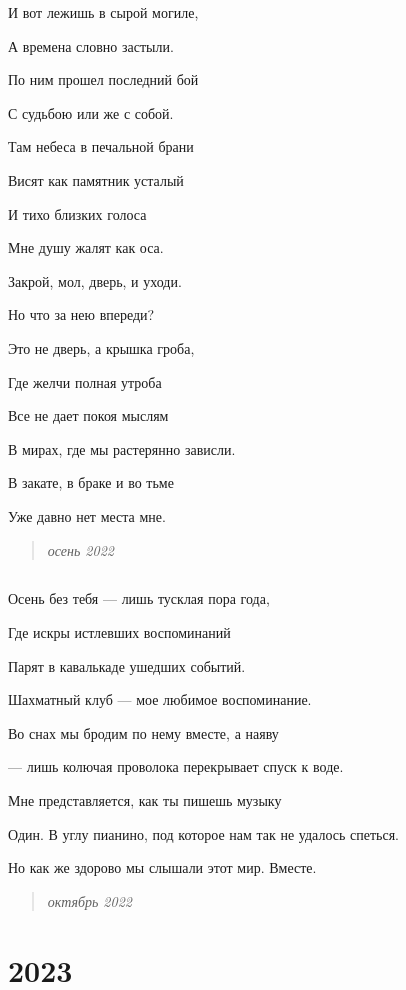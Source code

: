 \documentclass[
  a5paperpaper,
  DIV=11,
  numbers=noendperiod]{scrreprt}
\begin{document}
И вот лежишь в сырой могиле,

А времена словно застыли.

По ним прошел последний бой

С судьбою или же с собой.

Там небеса в печальной брани

Висят как памятник усталый

И тихо близких голоса

Мне душу жалят как оса.

Закрой, мол, дверь, и уходи.

Но что за нею впереди?

Это не дверь, а крышка гроба,

Где желчи полная утроба

Все не дает покоя мыслям

В мирах, где мы растерянно зависли.

В закате, в браке и во тьме

Уже давно нет места мне.

\begin{quote}
\emph{осень 2022}
\end{quote}

\section*{}\label{section-15}

\markright{}

Осень без тебя --- лишь тусклая пора года,

Где искры истлевших воспоминаний

Парят в кавалькаде ушедших событий.

Шахматный клуб --- мое любимое воспоминание.

Во снах мы бродим по нему вместе, а наяву

--- лишь колючая проволока перекрывает спуск к воде.

Мне представляется, как ты пишешь музыку

Один. В углу пианино, под которое нам так не удалось спеться.

Но как же здорово мы слышали этот мир. Вместе.

\begin{quote}
\emph{октябрь 2022}
\end{quote}


\chapter*{2023}\label{section-16}
\end{document}
